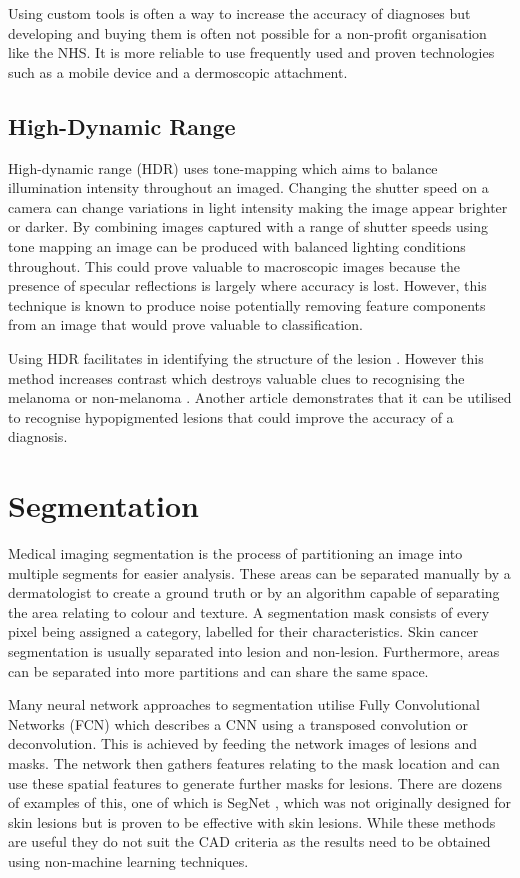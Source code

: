\documentclass[12pt]{report}
\begin{document}
Using custom tools is often a way to increase the accuracy of diagnoses but developing and buying them is often not possible for a non-profit organisation like the NHS. It is more reliable to use frequently used and proven technologies such as a mobile device and a dermoscopic attachment.

\subsection{High-Dynamic Range}
High-dynamic range (HDR) uses tone-mapping which aims to balance illumination intensity throughout an imaged. Changing the shutter speed on a camera can change variations in light intensity making the image appear brighter or darker. By combining images captured with a range of shutter speeds using tone mapping an image can be produced with balanced lighting conditions throughout. This could prove valuable to macroscopic images because the presence of specular reflections is largely where accuracy is lost. However, this technique is known to produce noise potentially removing feature components from an image that would prove valuable to classification.

Using HDR facilitates in identifying the structure of the lesion \cite{Sato2013}. However this method increases contrast which destroys valuable clues to recognising the melanoma or non-melanoma \cite{Sato2014}. Another article demonstrates that it can be utilised to recognise hypopigmented lesions \cite{Braun2015} that could improve the accuracy of a diagnosis.

\section{Segmentation}
Medical imaging segmentation is the process of partitioning an image into multiple segments for easier analysis. These areas can be separated manually by a dermatologist to create a ground truth or by an algorithm capable of separating the area relating to colour and texture. A segmentation mask consists of every pixel being assigned a category, labelled for their characteristics. Skin cancer segmentation is usually separated into lesion and non-lesion. Furthermore, areas can be separated into more partitions and can share the same space.

Many neural network approaches to segmentation utilise Fully Convolutional Networks (FCN)\cite{Yuan2017c} which describes a CNN using a transposed convolution or deconvolution. This is achieved by feeding the network images of lesions and masks. The network then gathers features relating to the mask location and can use these spatial features to generate further masks for lesions. There are dozens of examples of this, one of which is SegNet \cite{Badrinarayanan2017}, which was not originally designed for skin lesions but is proven to be effective with skin lesions. While these methods are useful they do not suit the CAD criteria as the results need to be obtained using non-machine learning techniques.
\end{document}
